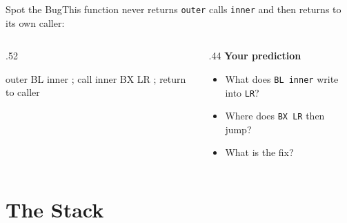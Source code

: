 \documentclass[9pt,aspectratio=169,xcolor=table]{beamer}
\begin{document}
{\beamerextras
\begin{frame}[fragile]{Spot the Bug}{This function never returns}
    \leavevmode
    \texttt{outer} calls \texttt{inner} and then returns to its own caller:

    \vspace{2mm}
    \begin{columns}[T]
    \begin{column}{.52\textwidth}
\begin{asm}[basicstyle=\ttfamily\small]
outer
    BL    inner     ; call inner
    BX    LR        ; return to caller
\end{asm}
    \end{column}
    \begin{column}{.44\textwidth}
        \textbf{Your prediction}
        {\small
        \begin{itemize}\itemsep2pt
            \item What does \texttt{BL inner} write into \texttt{LR}?
            \item Where does \texttt{BX LR} then jump?
            \item What is the fix?
        \end{itemize}}
    \end{column}
    \end{columns}

    \vspace{2mm}
\end{frame}
}


\section{The Stack}
\end{document}
